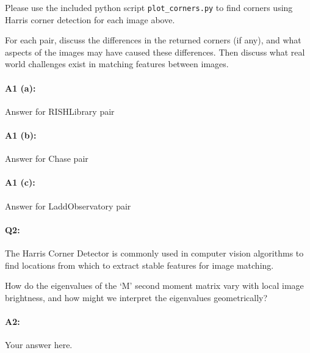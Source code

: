 Please use the included python script \texttt{plot\_corners.py} to find corners using Harris corner detection for each image above.

For each pair, discuss the differences in the returned corners (if any), and what aspects of the images may have caused these differences. Then discuss what real world challenges exist in matching features between images.


\paragraph{A1 (a):} Answer for RISHLibrary pair






\pagebreak
\paragraph{A1 (b):} Answer for Chase pair






\pagebreak
\paragraph{A1 (c):} Answer for LaddObservatory pair








\pagebreak
\paragraph{Q2:}
The Harris Corner Detector is commonly used in computer vision algorithms to find locations from which to extract stable features for image matching.

How do the eigenvalues of the `M' second moment matrix vary with local image brightness, and how might we interpret the eigenvalues geometrically?

\paragraph{A2:} Your answer here.







